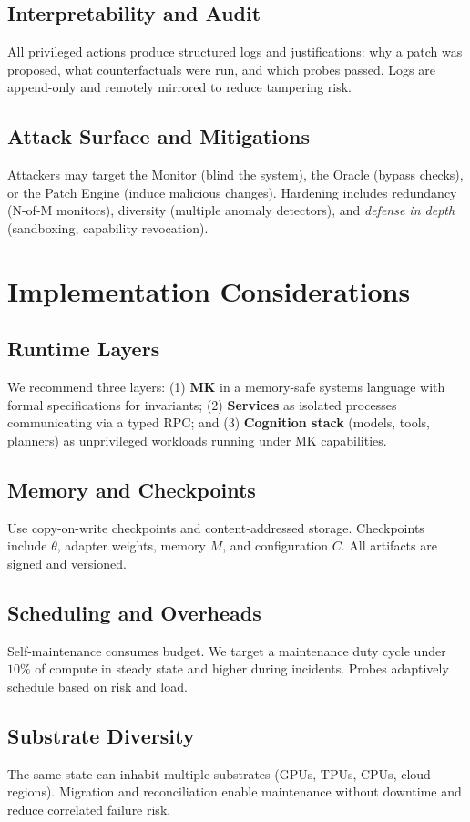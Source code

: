 \documentclass[12pt]{article}
\begin{document}
\subsection{Interpretability and Audit}
All privileged actions produce structured logs and justifications: why a patch was proposed, what counterfactuals were run, and which probes passed. Logs are append-only and remotely mirrored to reduce tampering risk.

\subsection{Attack Surface and Mitigations}
Attackers may target the Monitor (blind the system), the Oracle (bypass checks), or the Patch Engine (induce malicious changes). Hardening includes redundancy (N-of-M monitors), diversity (multiple anomaly detectors), and \emph{defense in depth} (sandboxing, capability revocation).

\section{Implementation Considerations}
\subsection{Runtime Layers}
We recommend three layers: (1) \textbf{MK} in a memory-safe systems language with formal specifications for invariants; (2) \textbf{Services} as isolated processes communicating via a typed RPC; and (3) \textbf{Cognition stack} (models, tools, planners) as unprivileged workloads running under MK capabilities.

\subsection{Memory and Checkpoints}
Use copy-on-write checkpoints and content-addressed storage. Checkpoints include $\theta$, adapter weights, memory $M$, and configuration $C$. All artifacts are signed and versioned.

\subsection{Scheduling and Overheads}
Self-maintenance consumes budget. We target a maintenance duty cycle under $10\%$ of compute in steady state and higher during incidents. Probes adaptively schedule based on risk and load.

\subsection{Substrate Diversity}
The same state can inhabit multiple substrates (GPUs, TPUs, CPUs, cloud regions). Migration and reconciliation enable maintenance without downtime and reduce correlated failure risk.
\end{document}
